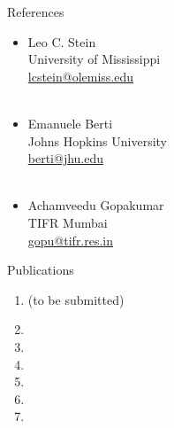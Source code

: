 \documentclass{resume} %
\begin{document}
\begin{rSection}{References}


\begin{multicols}{3}
\begin{itemize}
\item  Leo C. Stein      \\University of Mississippi\\ \href{lcstein@olemiss.edu}{lcstein@olemiss.edu} \\ \\
\item Emanuele Berti\\Johns Hopkins University\\ \href{berti@jhu.edu}{berti@jhu.edu}     \\ \\
\item Achamveedu Gopakumar\\TIFR Mumbai\\ \href{gopu@tifr.res.in}{gopu@tifr.res.in}    \\ 
\end{itemize}
\end{multicols}


\end{rSection}

\fi



  



\begin{rSection}{Publications}
  \begin{enumerate} 
    \item {}  (to be submitted)
    \item {}
  	\item {}
  	\item {}
    \item {}
    \item {}
    \item {}
  \end{enumerate}
  \end{rSection}
\end{document}
